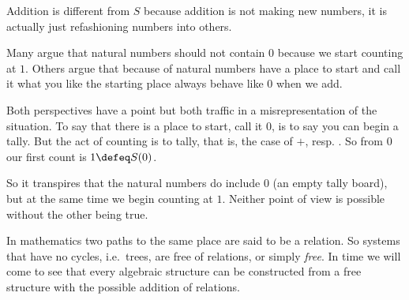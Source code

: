 Addition is different from $S$ because addition is not making new 
numbers, it is actually just refashioning numbers into others.  


\begin{remark}
    Many argue that natural numbers should not contain $0$ because we start counting 
    at $1$.  Others argue that because of natural numbers have a place to start 
    and call it what you like the starting place always behave like $0$ when we add.

    Both perspectives have a point but both traffic in a misrepresentation of the 
    situation.  To say that there is a place to start, call it 0, is to say 
    you can begin a tally.  But the act of counting is to tally, that is, the case 
    of $+$, resp. . So from $0$ our first count is $1\defeq S(0)$. 
    
    So it transpires that the
    natural numbers do include $0$ (an empty tally board), but at the same time
    we begin counting at $1$.  Neither point of view is possible without the other
    being true.
\end{remark}

In mathematics two paths to the same place are said to be a relation.  So systems that have no cycles, i.e.\ trees, are 
free of relations, or simply \emph{free}.  In time we will come to see 
that every algebraic structure can be constructed from a free 
structure with the possible addition of relations.

